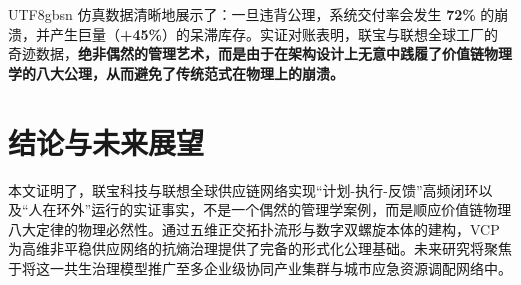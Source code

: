 \documentclass[11pt,a4paper]{article}
\begin{document}
\begin{CJK*}{UTF8}{gbsn}
仿真数据清晰地展示了：一旦违背公理，系统交付率会发生 \textbf{72\%} 的崩溃，并产生巨量（\textbf{+45\%}）的呆滞库存。实证对账表明，联宝与联想全球工厂的奇迹数据，\textbf{绝非偶然的管理艺术，而是由于在架构设计上无意中践履了价值链物理学的八大公理，从而避免了传统范式在物理上的崩溃。}

\section{结论与未来展望}
本文证明了，联宝科技与联想全球供应链网络实现“计划-执行-反馈”高频闭环以及“人在环外”运行的实证事实，不是一个偶然的管理学案例，而是顺应价值链物理八大定律的物理必然性。通过五维正交拓扑流形与数字双螺旋本体的建构，VCP 为高维非平稳供应网络的抗熵治理提供了完备的形式化公理基础。未来研究将聚焦于将这一共生治理模型推广至多企业级协同产业集群与城市应急资源调配网络中。


\end{CJK*}
\end{document}
